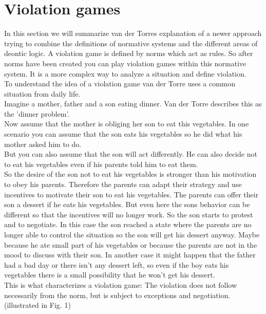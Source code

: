 \documentclass[conference]{hehe}
\begin{document}
\section{Violation games}
In this section we will summarize van der Torres explanation of a newer approach trying to combine the definitions of normative systems and the different areas of deontic logic. A violation game is defined by norms which act as rules. So after norms have been created you can play violation games within this normative system. It is a more complex way to analyze a situation and define violation.\\
To understand the idea of a violation game van der Torre uses a common situation from daily life.\\
Imagine a mother, father and a son eating dinner. Van der Torre describes this as the 'dinner problem'.\\
Now assume that the mother is obliging her son to eat this vegetables. In one scenario you can assume that the son eats his vegetables so he did what his mother asked him to do.\\
But you can also assume that the son will act differently. He can also decide not to eat his vegetables even if his parents told him to eat them.\\
So the desire of the son not to eat his vegetables is stronger than his motivation to obey his parents. Therefore the parents can adapt their strategy and use incentives to motivate their son to eat his vegetables. The parents can offer their son a dessert if he eats his vegetables. But even here the sons behavior can be different so that the incentives will no longer work. So the son starts to protest and to negotiate. In this case the son reached a state where the parents are no longer able to control the situation so the son will get his dessert anyway. Maybe because he ate small part of his vegetables or because the parents are not in the mood to discuss with their son. In another case it might happen that the father had a bad day or there isn't any dessert left, so even if the boy eats his vegetables there is a small possibility that he won't get his dessert. \\
This is what characterizes a violation game: The violation does not follow necessarily from the norm, but is subject to exceptions and negotiation. (illustrated in Fig. 1)
\end{document}
